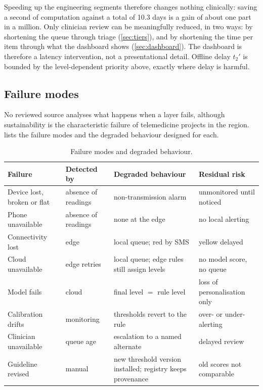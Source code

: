 Speeding up the engineering segments therefore changes nothing clinically: saving a second of computation against a total of 10.3 days is a gain of about one part in a million. Only clinician review can be meaningfully reduced, in two ways: by shortening the queue through triage (\cref{sec:tiers}), and by shortening the time per item through what the dashboard shows (\cref{sec:dashboard}). The dashboard is therefore a latency intervention, not a presentational detail. Offline delay $t_2'$ is bounded by the level-dependent priority above, exactly where delay is harmful.

\subsection{Failure modes}\label{sec:failure}

No reviewed source analyses what happens when a layer fails, although sustainability is the characteristic failure of telemedicine projects in the region.  lists the failure modes and the degraded behaviour designed for each.

\begin{table}[htbp]
\centering\footnotesize
\caption{Failure modes and degraded behaviour.}\label{tab:failure-modes}
\begin{tabularx}{\textwidth}{@{}>{\raggedright\arraybackslash}p{3.0cm} >{\raggedright\arraybackslash}p{2.4cm} X >{\raggedright\arraybackslash}p{3.0cm}@{}}
\toprule
\textbf{Failure} & \textbf{Detected by} & \textbf{Degraded behaviour} & \textbf{Residual risk} \\
\midrule
Device lost, broken or flat & absence of readings & non-transmission alarm & unmonitored until noticed \\
Phone unavailable & absence of readings & none at the edge & no local alerting \\
Connectivity lost & edge & local queue; red by SMS & yellow delayed \\
Cloud unavailable & edge retries & local queue; edge rules still assign levels & no model score, no queue \\
Model fails & cloud & final level $=$ rule level & loss of personalisation only \\
Calibration drifts & monitoring & thresholds revert to the rule & over- or under-alerting \\
Clinician unavailable & queue age & escalation to a named alternate & delayed review \\
Guideline revised & manual & new threshold version installed; registry keeps provenance & old scores not comparable \\
\bottomrule
\end{tabularx}
\end{table}


